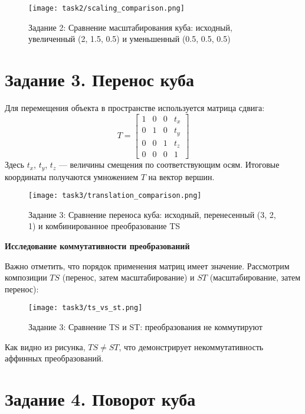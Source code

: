 \begin{figure}[h!]
    \centering
    \texttt{[image: task2/scaling\_comparison.png]}
    \caption{Задание 2: Сравнение масштабирования куба: исходный, увеличенный (2, 1.5, 0.5) и уменьшенный (0.5, 0.5, 0.5)}
\end{figure}

\section{Задание 3. Перенос куба}

Для перемещения объекта в пространстве используется матрица сдвига:
\[
T = \begin{bmatrix}
    1 & 0 & 0 & t_x \\
    0 & 1 & 0 & t_y \\
    0 & 0 & 1 & t_z \\
    0 & 0 & 0 & 1
\end{bmatrix}
\]
Здесь $t_x$, $t_y$, $t_z$ --- величины смещения по соответствующим осям. Итоговые координаты получаются умножением $T$ на вектор вершин.

\begin{figure}[h!]
    \centering
    \texttt{[image: task3/translation\_comparison.png]}
    \caption{Задание 3: Сравнение переноса куба: исходный, перенесенный (3, 2, 1) и комбинированное преобразование TS}
\end{figure}

\textbf{Исследование коммутативности преобразований}

Важно отметить, что порядок применения матриц имеет значение. Рассмотрим композиции $TS$ (перенос, затем масштабирование) и $ST$ (масштабирование, затем перенос):

\begin{figure}[h!]
    \centering
    \texttt{[image: task3/ts\_vs\_st.png]}
    \caption{Задание 3: Сравнение TS и ST: преобразования не коммутируют}
\end{figure}

Как видно из рисунка, $TS \neq ST$, что демонстрирует некоммутативность аффинных преобразований.

\section{Задание 4. Поворот куба}

